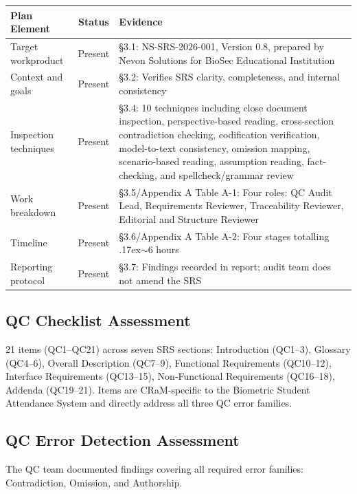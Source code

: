 \documentclass[11pt,a4paper]{article}
\begin{document}
\begin{table}[H]
\centering\small
\begin{tabular}{|l|c|>{\RaggedRight\arraybackslash}m{7.5cm}|}
\hline
\rowcolor{tableheader}
\textbf{Plan Element} & \textbf{Status} & \textbf{Evidence} \\\hline
Target workproduct & Present & \S3.1: NS-SRS-2026-001, Version 0.8, prepared by Nevon Solutions for BioSec Educational Institution \\\hline
Context and goals & Present & \S3.2: Verifies SRS clarity, completeness, and internal consistency \\\hline
Inspection techniques & Present & \S3.4: 10 techniques including close document inspection, perspective-based reading, cross-section contradiction checking, codification verification, model-to-text consistency, omission mapping, scenario-based reading, assumption reading, fact-checking, and spellcheck/grammar review \\\hline
Work breakdown & Present & \S3.5/Appendix A Table A-1: Four roles: QC Audit Lead, Requirements Reviewer, Traceability Reviewer, Editorial and Structure Reviewer \\\hline
Timeline & Present & \S3.6/Appendix A Table A-2: Four stages totalling {\raise.17ex\hbox{$\scriptstyle\sim$}}6 hours \\\hline
Reporting protocol & Present & \S3.7: Findings recorded in report; audit team does not amend the SRS \\\hline
\end{tabular}
\end{table}

\subsection{QC Checklist Assessment}

21 items (QC1--QC21) across seven SRS sections: Introduction (QC1--3), Glossary (QC4--6), Overall Description (QC7--9), Functional Requirements (QC10--12), Interface Requirements (QC13--15), Non-Functional Requirements (QC16--18), Addenda (QC19--21). Items are CRaM-specific to the Biometric Student Attendance System and directly address all three QC error families.

\subsection{QC Error Detection Assessment}

The QC team documented findings covering all required error families: Contradiction, Omission, and Authorship.
\end{document}

